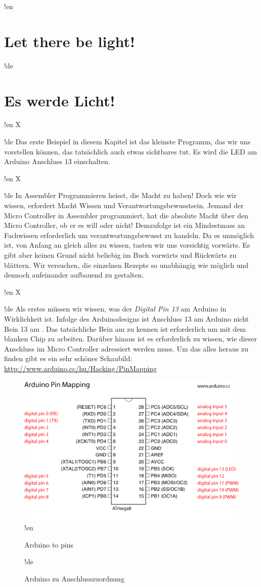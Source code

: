 !en \section{Let there be light!}
!de \section{Es werde Licht!}

!en X

!de Das erste Beispiel in diesem Kapitel ist das kleinste Programm, das wir uns vorstellen können, das tatsächlich auch etwas sichtbares tut. Es wird die LED am Arduino Anschluss 13 einschalten.



!en X

!de In Assembler Programmieren heisst, die Macht zu haben! Doch wie wir wissen, erfordert Macht Wissen und Verantwortungsbewusstsein. Jemand der Micro Controller in Assembler programmiert, hat die absolute Macht über den Micro Controller, ob er es will oder nicht! Demzufolge ist ein Mindestmass an Fachwissen erforderlich um verantwortungsbewusst zu handeln. Da es unmöglich ist, von Anfang an gleich alles zu wissen, tasten wir uns vorsichtig vorwärts. Es gibt aber keinen Grund nicht beliebig im Buch vorwärts und Rückwärts zu blättern. Wir versuchen, die einzelnen Rezepte so unabhängig wie möglich und dennoch aufeinander aufbauend zu gestalten.



!en X

!de Als erstes müssen wir wissen, was der \textit{Digital Pin 13} am Arduino in Wirklichkeit ist. Infolge des Arduinodesigns ist Anschluss 13 am Arduino nicht Bein 13 am \at{}. Das tatsächliche Bein am \at{} zu kennen ist erforderlich um mit dem blanken Chip zu arbeiten. Darüber hinaus ist es erforderlich zu wissen, wie dieser Anschluss im Micro Controller adressiert werden muss. Um das alles heraus zu finden gibt es ein sehr schönes Schaubild: \url{http://www.arduino.cc/hu/Hacking/PinMapping}


\begin{figure}[htbp]
  \centering
  \includegraphics[width=120mm]{Media/www-arduino-cc_Arduino-To-Atmega8-Pins.png}
!en   \caption{Arduino to \at  pins}
!de   \caption{Arduino zu \at  Anschlusszuordnung}
  \label{arduino-to-atmega-pins}
\end{figure}



